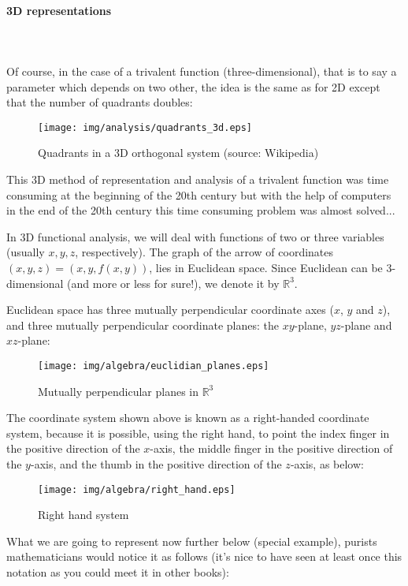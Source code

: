 \paragraph{3D representations}\mbox{}\\\\
Of course, in the case of a trivalent function (three-dimensional), that is to say a parameter which depends on two other, the idea is the same as for 2D except that the number of quadrants doubles:

\begin{figure}[H]
\centering
\texttt{[image: img/analysis/quadrants\_3d.eps]}
\caption[Quadrants in a 3D orthogonal system]{Quadrants in a 3D orthogonal system (source: Wikipedia)}
\end{figure}

This 3D method of representation and analysis of a trivalent function was time consuming at the beginning of the 20th century but with the help of computers in the end of the 20th century this time consuming problem was almost solved...

In 3D functional analysis, we will deal with functions of two or three variables (usually  $x, y, z$, respectively). The graph of the arrow of coordinates $(x, y, z)=(x,y,f(x,y))$, lies in Euclidean space. Since Euclidean can be 3-dimensional (and more or less for sure!), we denote it by $\mathbb{R}^3$.

Euclidean space has three mutually perpendicular coordinate axes ($x$, $y$ and $z$), and three mutually perpendicular coordinate planes: the $xy$-plane, $yz$-plane and $xz$-plane:

\begin{figure}[H]
\centering
\texttt{[image: img/algebra/euclidian\_planes.eps]}
\caption{Mutually perpendicular planes in $\mathbb{R}^3$}
\end{figure}

The coordinate system shown above is known as a right-handed coordinate system, because it is possible, using the right hand, to point the index finger in the positive direction of the $x$-axis, the middle finger in the positive direction of the $y$-axis, and the thumb in the positive direction of the $z$-axis, as below:

\begin{figure}[H]
\centering
\texttt{[image: img/algebra/right\_hand.eps]}
\caption{Right hand system}
\end{figure}

What we are going to represent now further below (special example), purists mathematicians would notice it as follows (it's nice to have seen at least once this notation as you could meet it in other books):
	
